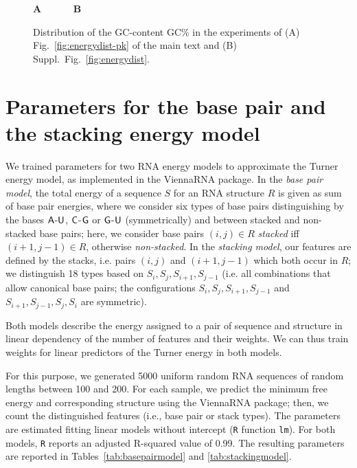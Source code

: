 \documentclass[10pt]{article}
\makeatletter
\newlength{\@aligneps}
\newcommand{\includegraphicstop}[2][]{%
\sbox{\@alignepsbox}{\texttt{[image: \#2]}}%
\setlength{\@aligneps}{-\ht\@alignepsbox}%
\addtolength{\@aligneps}{2ex}%
\raisebox{\@aligneps}{\usebox{\@alignepsbox}}}
\newcommand{\Def}[1]{\emph{#1}}
\newcommand{\Nuc}[1]{{\sf #1}}
\newcommand{\Ab}{\Nuc{A}}
\newcommand{\Cb}{\Nuc{C}}
\newcommand{\Gb}{\Nuc{G}}
\newcommand{\Ub}{\Nuc{U}}
\newcommand{\GCb}{\Gb\Cb}
\newcommand{\Software}[1]{{\ttfamily #1}}
\makeatother
\begin{document}
\begin{figure}
  \begin{center}
    {\sf \bfseries A}~\includegraphicstop[width=0.45\textwidth]{Figs/Plots/PKB00211_PKB00239_0_GC_content}
    ~~~~~{\sf \bfseries B}~\includegraphicstop[width=0.45\textwidth]{Figs/Plots/supp_3str_GC_content}
  \end{center}
  \caption{Distribution of the \GCb-content \GCb\% in the experiments of (A) Fig.~\ref{fig:energydist-pk} of the main text and (B) Suppl.~Fig.~\ref{fig:energydist}.}
  \label{fig:gc-content}
\end{figure}

\section{Parameters for the base pair and the stacking energy model}
\label{appsec:modelparameters}

We trained parameters for two RNA energy models to approximate the
Turner energy model, as implemented in the \Software{ViennaRNA}
package.  In the \Def{base pair model}, the total energy of a sequence $S$
for an RNA structure $R$ is given as sum of base pair energies, where
we consider six types of base pairs distinguishing by the bases $\Ab$-$\Ub$,
$\Cb$-$\Gb$ or $\Gb$-$\Ub$ (symmetrically) and between stacked and non-stacked base
pairs; here, we consider base pairs $(i,j)\in R$ \Def{stacked} iff
$(i+1,j-1)\in R$, otherwise \Def{non-stacked}. In the \Def{stacking model},
our features are defined by the stacks, i.e. pairs $(i,j)$ and
$(i+1,j-1)$ which both occur in $R$; we distinguish 18 types based on
$S_i,S_j,S_{i+1},S_{j-1}$ (i.e. all combinations that allow canonical
base pairs; the configurations $S_i,S_j,S_{i+1},S_{j-1}$ and
$S_{i+1},S_{j-1},S_j,S_i$ are symmetric).

Both models describe the energy assigned to a pair of sequence and
structure in linear dependency of the number of features and their
weights. We can thus train weights for linear predictors of the Turner
energy in both models.

For this purpose, we generated 5000 uniform random RNA sequences of
random lengths between 100 and 200. For each sample, we predict the
minimum free energy and corresponding structure using the ViennaRNA
package; then, we count the distinguished features (i.e., base pair or
stack types). The parameters are estimated fitting linear models
without intercept (\texttt{R} function \texttt{lm}). For both models,
\texttt{R} reports an adjusted R-squared value of 0.99. The resulting
parameters are reported in Tables~\ref{tab:basepairmodel} and
\ref{tab:stackingmodel}.
\end{document}
